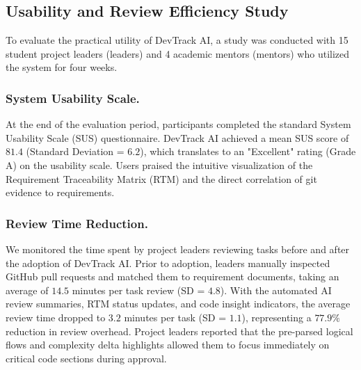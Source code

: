 \subsection{Usability and Review Efficiency Study}

To evaluate the practical utility of DevTrack AI, a study was conducted with 15 student project leaders (leaders) and 4 academic mentors (mentors) who utilized the system for four weeks.

\subsubsection{System Usability Scale.}
At the end of the evaluation period, participants completed the standard System Usability Scale (SUS) questionnaire. DevTrack AI achieved a mean SUS score of $81.4$ (Standard Deviation = $6.2$), which translates to an "Excellent" rating (Grade A) on the usability scale. Users praised the intuitive visualization of the Requirement Traceability Matrix (RTM) and the direct correlation of git evidence to requirements.

\subsubsection{Review Time Reduction.}
We monitored the time spent by project leaders reviewing tasks before and after the adoption of DevTrack AI. Prior to adoption, leaders manually inspected GitHub pull requests and matched them to requirement documents, taking an average of $14.5$ minutes per task review (SD = $4.8$). With the automated AI review summaries, RTM status updates, and code insight indicators, the average review time dropped to $3.2$ minutes per task (SD = $1.1$), representing a $77.9\%$ reduction in review overhead. Project leaders reported that the pre-parsed logical flows and complexity delta highlights allowed them to focus immediately on critical code sections during approval.
